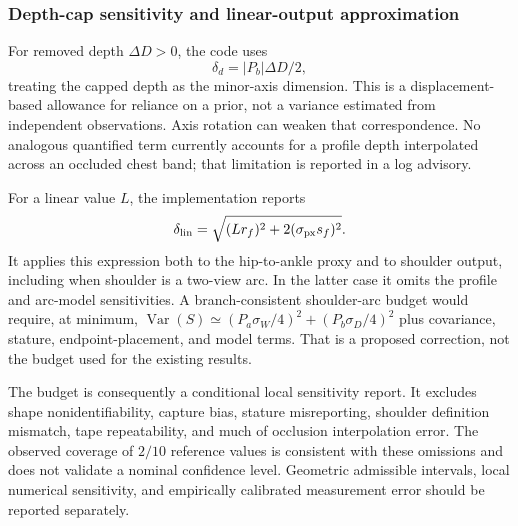 \documentclass[journal]{IEEEtran}
\begin{document}
\subsubsection{Depth-cap sensitivity and linear-output approximation}
For removed depth $\Delta D>0$, the code uses
\begin{equation}
\delta_d=|P_b|\Delta D/2,
\end{equation}
treating the capped depth as the minor-axis dimension. This is a displacement-based allowance for reliance on a prior, not a variance estimated from independent observations. Axis rotation can weaken that correspondence. No analogous quantified term currently accounts for a profile depth interpolated across an occluded chest band; that limitation is reported in a log advisory.

For a linear value $L$, the implementation reports
\begin{equation}
\delta_{\rm lin}=\sqrt{(Lr_f)^2+2(\sigma_{\rm px}s_f)^2}.
\end{equation}
It applies this expression both to the hip-to-ankle proxy and to shoulder output, including when shoulder is a two-view arc. In the latter case it omits the profile and arc-model sensitivities. A branch-consistent shoulder-arc budget would require, at minimum, $\operatorname{Var}(S)\simeq(P_a\sigma_W/4)^2+(P_b\sigma_D/4)^2$ plus covariance, stature, endpoint-placement, and model terms. That is a proposed correction, not the budget used for the existing results.

The budget is consequently a conditional local sensitivity report. It excludes shape nonidentifiability, capture bias, stature misreporting, shoulder definition mismatch, tape repeatability, and much of occlusion interpolation error. The observed coverage of $2/10$ reference values is consistent with these omissions and does not validate a nominal confidence level. Geometric admissible intervals, local numerical sensitivity, and empirically calibrated measurement error should be reported separately.
\end{document}
